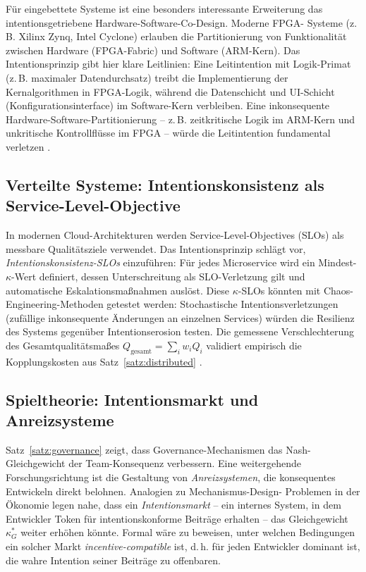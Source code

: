 ﻿\documentclass[a4paper,12pt]{article}
\theoremstyle{definition}
\begin{document}
Für eingebettete Systeme ist eine besonders interessante Erweiterung
das intentionsgetriebene Hardware-Software-Co-Design. Moderne FPGA-
Systeme (z.\,B. Xilinx Zynq, Intel Cyclone) erlauben die Partitionierung
von Funktionalität zwischen Hardware (FPGA-Fabric) und Software (ARM-Kern).
Das Intentionsprinzip gibt hier klare Leitlinien: Eine Leitintention
mit Logik-Primat (z.\,B. \glqq{}maximaler Datendurchsatz\grqq{}) treibt die
Implementierung der Kernalgorithmen in FPGA-Logik, während die
Datenschicht und UI-Schicht (Konfigurationsinterface) im Software-Kern
verbleiben. Eine inkonsequente Hardware-Software-Partitionierung --
z.\,B. zeitkritische Logik im ARM-Kern und unkritische Kontrollflüsse
im FPGA -- würde die Leitintention fundamental verletzen
\cite{epp2026subgraph}.

\subsection{Verteilte Systeme: Intentionskonsistenz als Service-Level-Objective}

In modernen Cloud-Architekturen werden Service-Level-Objectives (SLOs)
als messbare Qualitätsziele verwendet. Das Intentionsprinzip schlägt
vor, \emph{Intentionskonsistenz-SLOs} einzuführen: Für jedes Microservice
wird ein Mindest-$\kappa$-Wert definiert, dessen Unterschreitung als
SLO-Verletzung gilt und automatische Eskalationsmaßnahmen auslöst.
Diese $\kappa$-SLOs könnten mit Chaos-Engineering-Methoden getestet
werden: Stochastische Intentionsverletzungen (zufällige inkonsequente
Änderungen an einzelnen Services) würden die Resilienz des Systems
gegenüber Intentionserosion testen. Die gemessene Verschlechterung
des Gesamtqualitätsmaßes $Q_{\text{gesamt}} = \sum_{i} w_i Q_i$
validiert empirisch die Kopplungskosten aus Satz~\ref{satz:distributed}
\cite{brewer2000cap}.

\subsection{Spieltheorie: Intentionsmarkt und Anreizsysteme}

Satz~\ref{satz:governance} zeigt, dass Governance-Mechanismen das
Nash-Gleichgewicht der Team-Konsequenz verbessern. Eine weitergehende
Forschungsrichtung ist die Gestaltung von \emph{Anreizsystemen}, die
konsequentes Entwickeln direkt belohnen. Analogien zu Mechanismus-Design-
Problemen in der Ökonomie \cite{osborne1994gametheory} legen nahe, dass
ein \emph{Intentionsmarkt} -- ein internes System, in dem Entwickler
Token für intentionskonforme Beiträge erhalten -- das Gleichgewicht
$\kappa^*_G$ weiter erhöhen könnte. Formal wäre zu beweisen, unter
welchen Bedingungen ein solcher Markt \emph{incentive-compatible}
ist, d.\,h. für jeden Entwickler dominant ist, die wahre Intention
seiner Beiträge zu offenbaren.
\end{document}
